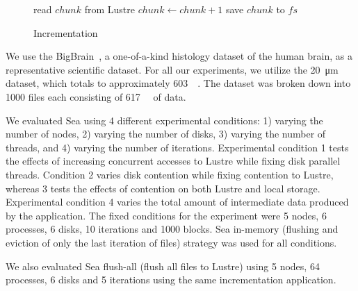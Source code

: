 \documentclass[10pt,journal,compsoc]{IEEEtran}
\makeatletter
\newcommand{\removelatexerror}{\let\@latex@error\@gobble}
\makeatother
\begin{document}
      \begin{figure}[!t]
        \removelatexerror
        \begin{algorithm}[H]
          \caption{Incrementation}\label{alg:sea-comp:incrementation}
          \SetAlgoLined 
            { 
              read $chunk$ from Lustre 
              { $chunk\gets chunk+1$ save $chunk$ to $fs$ }
            }
        \end{algorithm}
      \end{figure}

      We use the BigBrain~\cite{amunts2013bigbrain}, a one-of-a-kind histology
      dataset of the human brain, as a representative scientific dataset. For
      all our experiments, we utilize the \SI{20}{\micro\meter} dataset, which
      totals to approximately \SI{603}{\gibi\byte}. The dataset was broken down
      into 1000 files each consisting of \SI{617}{\mebi\byte} of data.
      
                                                                                   
      We evaluated Sea using 4 different experimental conditions: 1) varying the
      number of nodes, 2) varying the number of disks, 3) varying the number of
      threads, and 4) varying the number of iterations. Experimental condition 1
      tests the effects of increasing concurrent accesses to Lustre while fixing
      disk parallel threads. Condition 2 varies disk contention while fixing
      contention to Lustre, whereas 3 tests the effects of contention on both
      Lustre and local storage. Experimental condition 4 varies the total amount
      of intermediate data produced by the application. The fixed conditions for
      the experiment were 5 nodes, 6 processes, 6 disks, 10 iterations and 1000
      blocks. Sea in-memory (flushing and eviction of only the last iteration of
      files) strategy was used for all conditions.
      
      We also evaluated Sea flush-all (flush all files to Lustre) using 5 nodes,
      64 processes, 6 disks and 5 iterations using the same incrementation
      application.
\end{document}
